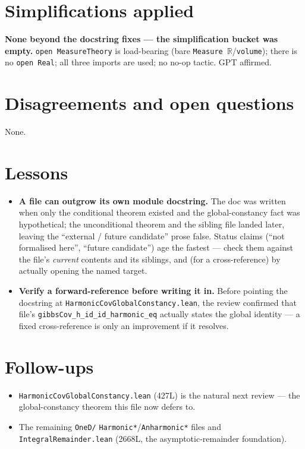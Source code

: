 \documentclass[11pt]{article}
\begin{document}
\section{Simplifications applied}
\textbf{None beyond the docstring fixes --- the simplification bucket was empty.} \texttt{open
MeasureTheory} is load-bearing (bare \texttt{Measure $\mathbb R$}/\texttt{volume}); there is no
\texttt{open Real}; all three imports are used; no no-op tactic. GPT affirmed.

\section{Disagreements and open questions}
None.

\section{Lessons}
\begin{itemize}[noitemsep]
  \item \textbf{A file can outgrow its own module docstring.} The doc was written when only the
    conditional theorem existed and the global-constancy fact was hypothetical; the unconditional
    theorem and the sibling file landed later, leaving the ``external / future candidate'' prose
    false. Status claims (``not formalised here'', ``future candidate'') age the fastest --- check
    them against the file's \emph{current} contents and its siblings, and (for a cross-reference) by
    actually opening the named target.
  \item \textbf{Verify a forward-reference before writing it in.} Before pointing the docstring at
    \texttt{HarmonicCovGlobalConstancy.lean}, the review confirmed that file's
    \texttt{gibbsCov\_h\_id\_id\_harmonic\_eq} actually states the global identity --- a fixed
    cross-reference is only an improvement if it resolves.
\end{itemize}

\section{Follow-ups}
\begin{itemize}[noitemsep]
  \item \texttt{HarmonicCovGlobalConstancy.lean} (427L) is the natural next review --- the
    global-constancy theorem this file now defers to.
  \item The remaining \texttt{OneD/} \texttt{Harmonic*}/\texttt{Anharmonic*} files and
    \texttt{IntegralRemainder.lean} (2668L, the asymptotic-remainder foundation).
\end{itemize}
\end{document}
